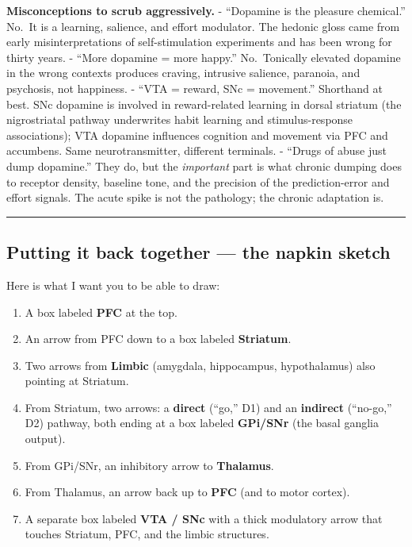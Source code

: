 \textbf{Misconceptions to scrub aggressively.} - ``Dopamine is the pleasure chemical.'' No.~It is a learning, salience, and effort modulator. The hedonic gloss came from early misinterpretations of self-stimulation experiments and has been wrong for thirty years. - ``More dopamine = more happy.'' No.~Tonically elevated dopamine in the wrong contexts produces craving, intrusive salience, paranoia, and psychosis, not happiness. - ``VTA = reward, SNc = movement.'' Shorthand at best. SNc dopamine is involved in reward-related learning in dorsal striatum (the nigrostriatal pathway underwrites habit learning and stimulus-response associations); VTA dopamine influences cognition and movement via PFC and accumbens. Same neurotransmitter, different terminals. - ``Drugs of abuse just dump dopamine.'' They do, but the \emph{important} part is what chronic dumping does to receptor density, baseline tone, and the precision of the prediction-error and effort signals. The acute spike is not the pathology; the chronic adaptation is.

\begin{center}\rule{0.5\linewidth}{0.5pt}\end{center}

\subsection{Putting it back together --- the napkin sketch}\label{06_neurology_101-putting-it-back-together-the-napkin-sketch}

Here is what I want you to be able to draw:

\begin{enumerate}
\def\labelenumi{\arabic{enumi}.}
\tightlist
\item
  A box labeled \textbf{PFC} at the top.
\item
  An arrow from PFC down to a box labeled \textbf{Striatum}.
\item
  Two arrows from \textbf{Limbic} (amygdala, hippocampus, hypothalamus) also pointing at Striatum.
\item
  From Striatum, two arrows: a \textbf{direct} (``go,'' D1) and an \textbf{indirect} (``no-go,'' D2) pathway, both ending at a box labeled \textbf{GPi/SNr} (the basal ganglia output).
\item
  From GPi/SNr, an inhibitory arrow to \textbf{Thalamus}.
\item
  From Thalamus, an arrow back up to \textbf{PFC} (and to motor cortex).
\item
  A separate box labeled \textbf{VTA / SNc} with a thick modulatory arrow that touches Striatum, PFC, and the limbic structures.
\end{enumerate}

